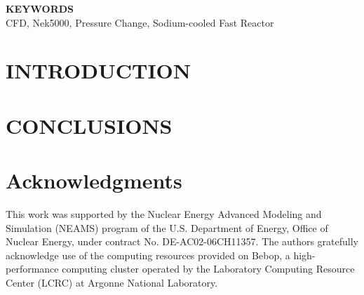 \documentclass[11pt,letterpaper,english]{article}
\begin{document}
\begin{flushleft}
{\bf KEYWORDS} \\
 CFD, Nek5000, Pressure Change, Sodium-cooled Fast Reactor
\end{flushleft}

\section{INTRODUCTION}








\section{CONCLUSIONS}



\section*{Acknowledgments}

This work was supported by the Nuclear Energy Advanced Modeling and Simulation (NEAMS) program of the U.S. Department of Energy, Office of Nuclear Energy, under contract No. DE-AC02-06CH11357. The authors gratefully acknowledge use of the computing resources provided on Bebop, a high-performance computing cluster operated by the Laboratory Computing Resource Center (LCRC) at Argonne National Laboratory. 


\clearpage


\clearpage
\begin{center}
\scriptsize
{}
\normalsize
\end{center}
\end{document}
